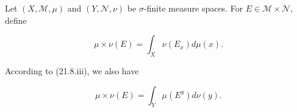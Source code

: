 Let $(X, \mathcal{M}, \mu)$ and $(Y, \mathcal{N}, \nu)$ be $\sigma$-finite measure spaces. For $E \in \mathcal{M} \times \mathcal{N}$, define

$$\mu \times \nu(E) = \int_X \nu(E_x) d\mu(x).$$

According to (21.8.iii), we also have

$$\mu \times \nu(E) = \int_Y \mu(E^y) d\nu(y).$$
